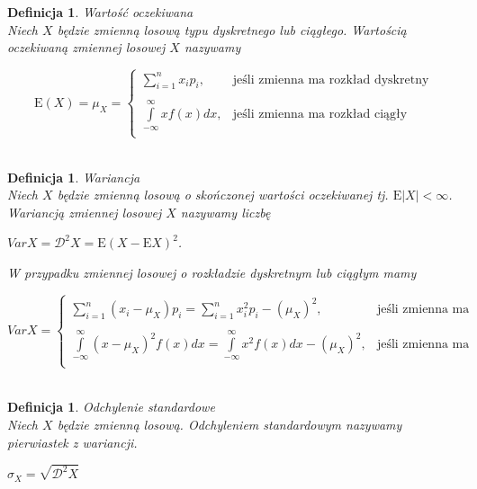 \documentclass[12pt,a4paper]{report}
\newtheorem{definition}[theorem]{Definicja}
\begin{document}
\begin{definition}{Wartość oczekiwana \cite[Rozdział 2.6]{krysicki1999}\\}
Niech $X$ będzie zmienną losową typu dyskretnego lub ciągłego. Wartością oczekiwaną zmiennej losowej $X$ nazywamy 
\begin{center}
$$\displaystyle \mathrm{E}(X)=\mu_X=\left\{ \begin{array}{ll}
\sum\limits_{i=1}^{n} {x_ip_i}, & \textrm{jeśli zmienna ma rozkład dyskretny} \\\\
\int\limits_{-\infty}^{\infty} {xf(x)dx}, & \textrm{jeśli zmienna ma rozkład ciągły}\\
\end{array} \right.$$\\
\end{center}
\end{definition}

\begin{definition}{Wariancja \cite [Rozdział5.6]{jakubowski2004}\\}
Niech $X$ będzie zmienną losową o skończonej wartości oczekiwanej tj. $\mathrm{E}|X| < \infty$. Wariancją zmiennej losowej $X$ nazywamy liczbę
\begin{center}
$VarX= \mathcal{D}^2X=\mathrm{E}(X-\mathrm{E}X)^2$.\\
\end{center}
W przypadku zmiennej losowej o rozkładzie dyskretnym lub ciągłym mamy
\begin{center}
$$\displaystyle VarX=\left\{ \begin{array}{ll}
\sum\limits_{i=1}^{n} (x_i-\mu_X)p_i=\sum\limits_{i=1}^{n} x_{i}^2p_i-(\mu_X)^2, & \textrm{jeśli zmienna ma rozkład dyskretny} \\\\
\int\limits_{-\infty}^{\infty}(x-\mu_X)^2f(x)dx=\int\limits_{-\infty}^{\infty} x^{2}f(x)dx-(\mu_X)^2, & \textrm{jeśli zmienna ma rozkład ciągły}\\
\end{array} \right.$$\\
\end{center}
\end{definition}


\begin{definition}{Odchylenie standardowe \cite[Rozdział 5.6]{jakubowski2004}\\}
Niech $X$ będzie zmienną losową. Odchyleniem standardowym nazywamy pierwiastek z wariancji. 
\begin{center}
$\sigma_X=\sqrt{\mathcal{D}^2X}$\\
\end{center}
\end{definition}
\end{document}
